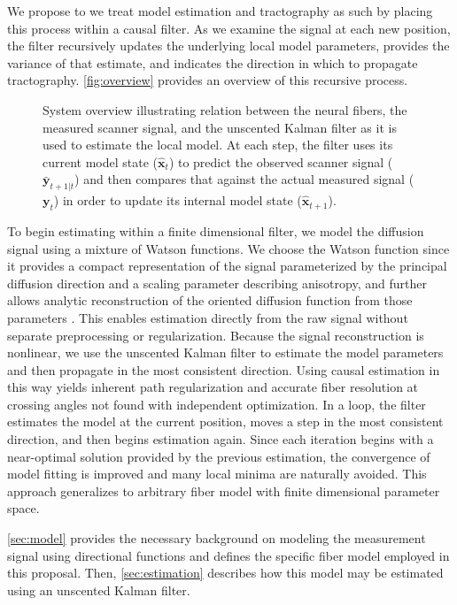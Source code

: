 \documentclass[letterpaper,hyperref,12pt]{gatech-thesis}
\renewcommand{\v}[1]{\ensuremath{\mathbf #1}\xspace}
\newcommand{\x}{\v x}
\newcommand{\y}{\v y}
\begin{document}
We propose to we treat model estimation and tractography as such by placing
this process within a causal filter.
%
As we examine the signal at each new position, the filter recursively updates
the underlying local model parameters, provides the variance of that estimate,
and indicates the direction in which to propagate tractography.
\autoref{fig:overview} provides an overview of this recursive process.
\begin{figure}[t]
  \centering
  \resizebox{!}{1.8in}{}
  \caption{System overview illustrating relation between the neural fibers,
    the measured scanner signal, and the unscented Kalman filter as it is used
    to estimate the local model.  At each step, the filter uses its current
    model state ($\hat{\x}_t$) to predict the observed scanner signal
    ($\bar{\y}_{t+1|t}$) and then compares that against the actual measured
    signal ($\y_t$) in order to update its internal model state
    ($\hat{\x}_{t+1}$).}
  \label{fig:overview}
\end{figure}

To begin estimating within a finite dimensional filter, we model the diffusion
signal using a mixture of Watson functions.  We choose the Watson function
since it provides a compact representation of the signal parameterized by the
principal diffusion direction and a scaling parameter describing anisotropy,
and further allows analytic reconstruction of the oriented diffusion function
from those parameters \cite{Rathi2009mia_w}.  This enables estimation directly
from the raw signal without separate preprocessing or regularization.
%
Because the signal reconstruction is nonlinear, we use the unscented Kalman
filter to estimate the model parameters and then propagate in the most
consistent direction.
%
Using causal estimation in this way yields inherent path regularization and
accurate fiber resolution at crossing angles not found with independent
optimization.  In a loop, the filter estimates the model at the current
position, moves a step in the most consistent direction, and then begins
estimation again.
%
Since each iteration begins with a near-optimal solution provided by the
previous estimation, the convergence of model fitting is improved and many
local minima are naturally avoided.
%
This approach generalizes to arbitrary fiber model with finite dimensional
parameter space.

\autoref{sec:model} provides the necessary background on modeling the
measurement signal using directional functions and defines the specific fiber
model employed in this proposal.  Then, \autoref{sec:estimation} describes how
this model may be estimated using an unscented Kalman filter.
\end{document}
